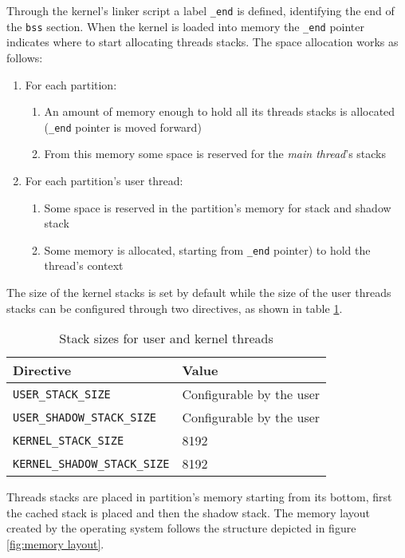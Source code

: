 Through the kernel's linker script a label \texttt{\_end} is defined, identifying the end of the \texttt{bss} section. When the kernel is loaded into memory the \texttt{\_end} pointer indicates where to start allocating threads stacks. The space allocation works as follows:

\begin{enumerate}
	\item For each partition:
		\begin{enumerate}
			\item An amount of memory enough to hold all its threads stacks is allocated (\texttt{\_end} pointer is moved forward)
			\item From this memory some space is reserved for the \textit{main thread}'s stacks
		\end{enumerate}
	\item For each partition's user thread:
		\begin{enumerate}
			\item Some space is reserved in the partition's memory for stack and shadow stack
			\item Some memory is allocated, starting from \texttt{\_end} pointer) to hold the thread's context
		\end{enumerate}
\end{enumerate} 

The size of the kernel stacks is set by default while the size of the user threads stacks can be configured through two directives, as shown in table \ref{tab:stack sizes}.

\begin{table}[!h]
\centering
\begin{tabular}{l|l}
\textbf{Directive} & \textbf{Value}\\
\toprule
\texttt{USER\_STACK\_SIZE} & Configurable by the user \\
\texttt{USER\_SHADOW\_STACK\_SIZE} & Configurable by the user \\
\texttt{KERNEL\_STACK\_SIZE} & 8192 \\
\texttt{KERNEL\_SHADOW\_STACK\_SIZE} & 8192 \\
\bottomrule
\end{tabular}
\caption{Stack sizes for user and kernel threads}
\label{tab:stack sizes}
\end{table}

Threads stacks are placed in partition's memory starting from its bottom, first the cached stack is placed and then the shadow stack. The memory layout created by the operating system follows the structure depicted in figure \ref{fig:memory layout}.

